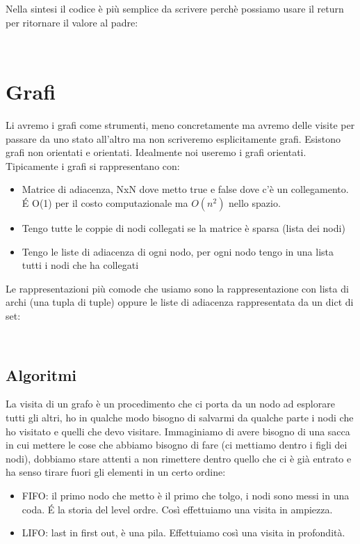 Nella sintesi il codice è più semplice da scrivere perchè possiamo usare il return per ritornare il valore al padre:
\begin{lstlisting}
    
\end{lstlisting}

\section{Grafi}
Li avremo i grafi come strumenti, meno concretamente ma avremo delle visite per passare da uno stato all'altro ma non scriveremo esplicitamente grafi.
Esistono grafi non orientati e orientati. Idealmente noi useremo i grafi orientati. Tipicamente i grafi si rappresentano con:
\begin{itemize}
    \item Matrice di adiacenza, NxN dove metto true e false dove c'è un collegamento. \'E O(1) per il costo computazionale ma $O(n^2)$ nello spazio.
    \item Tengo tutte le coppie di nodi collegati se la matrice è sparsa (lista dei nodi)
    \item Tengo le liste di adiacenza di ogni nodo, per ogni nodo tengo in una lista tutti i nodi che ha collegati
\end{itemize}

Le rappresentazioni più comode che usiamo sono la rappresentazione con lista di archi (una tupla di tuple) oppure le liste di adiacenza rappresentata da un dict di set:
\begin{lstlisting}
    
\end{lstlisting}

\subsection{Algoritmi}
La visita di un grafo è un procedimento che ci porta da un nodo ad esplorare tutti gli altri, ho in qualche modo bisogno di salvarmi da qualche parte i nodi che ho visitato e quelli che devo visitare. Immaginiamo di avere bisogno di una sacca in cui mettere le cose che abbiamo bisogno di fare (ci mettiamo dentro i figli dei nodi), dobbiamo stare attenti a non rimettere dentro quello che ci è già entrato e ha senso tirare fuori gli elementi in un certo ordine:
\begin{itemize}
    \item FIFO: il primo nodo che metto è il primo che tolgo, i nodi sono messi in una coda. \'E la storia del level ordre. Così effettuiamo una visita in ampiezza.
    \item LIFO: last in first out, è una pila. Effettuiamo così una visita in profondità.
\end{itemize}

